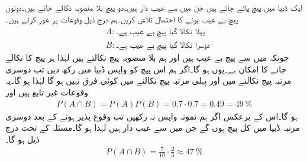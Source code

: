 \quad {}
ایک ڈبیا میں  پیچ پائے جاتے ہیں جن میں سے  عیب دار ہیں۔دو پیچ بلا منصوبہ نکالے جاتے ہیں۔دونوں پیچ بے عیب ہونے کا احتمال تلاش کریں۔ہم درج ذیل وقوعات پر غور کرتے ہیں۔
\begin{align*}
&A:\text{پہلا نکالا گیا پیچ بے عیب ہے۔}\\
&B:\text{دوسرا نکالا گیا پیچ بے عیب ہے۔}
\end{align*}
چونکہ  میں سے  پیچ بے  عیب ہیں اور ہم بلا منصوبہ پیچ نکالتے ہیں لہٰذا ہر پیچ کا نکالے جانے کا امکان  ہے۔یوں    ہو گا۔اگر ہم اس پیچ کو واپس ڈبیا میں رکھ دیں تب دوسری مرتبہ پیچ نکالنے میں اور پہلی مرتبہ پیچ نکالنے میں کوئی فرق نہیں ہو گا لہٰذا  ہو گا۔یہ وقوعات غیر تابع ہیں اور
\begin{align*}
P(A\cap B)=P(A)P(B)=0.7\cdot 0.7=0.49=\SI{49}{\percent}
\end{align*}
ہو گا۔اس کے برعکس اگر ہم نمونہ واپس نہ رکھیں تب  وقوع پذیر ہونے کے بعد دوسری مرتبہ ڈبیا میں کل  پیچ ہوں گے جن میں سے  عیب دار ہیں لہٰذا   ہو گا۔مسئلہ  کے تحت درج ذیل ہو گا۔
\begin{align*}
P(A\cap B)=\frac{7}{10}\cdot \frac{2}{3} \approx \SI{47}{\percent}
\end{align*}

